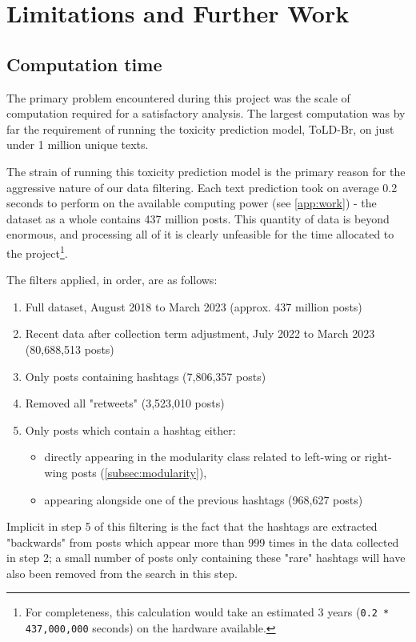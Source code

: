 \documentclass[a4paper,11pt]{article}  %
\begin{document}
	\section{Limitations and Further Work}
	\subsection{Computation time}
	\label{subsec:computation}
	The primary problem encountered during this project was the scale of computation required for a satisfactory analysis. The largest computation was by far the requirement of running the toxicity prediction model, ToLD-Br\parencite{leiteToxicLanguageDetection2020}, on just under 1 million unique texts.
	
	The strain of running this toxicity prediction model is the primary reason for the aggressive nature of our data filtering. Each text prediction took on average 0.2 seconds to perform on the available computing power (see \autoref{app:work}) - the dataset as a whole contains 437 million posts. This quantity of data is beyond enormous, and processing all of it is clearly unfeasible for the time allocated to the project\footnote{For completeness, this calculation would take an estimated 3 years (\texttt{0.2 * 437,000,000} seconds) on the hardware available.}.

	The filters applied, in order, are as follows:
	\begin{enumerate}
		\item Full dataset, August 2018 to March 2023 (approx. 437 million posts)
		\item Recent data after collection term adjustment, July 2022 to March 2023 (80,688,513 posts)
		\item Only posts containing hashtags (7,806,357 posts)
		\item Removed all "retweets" (3,523,010 posts)
		\item Only posts which contain a hashtag either:
		\begin{itemize}
			\item directly appearing in the modularity class related to left-wing or right-wing posts (\autoref{subsec:modularity}),
			\item appearing alongside one of the previous hashtags (968,627 posts)
		\end{itemize}
	\end{enumerate}
	Implicit in step 5 of this filtering is the fact that the hashtags are extracted "backwards" from posts which appear more than 999 times in the data collected in step 2; a small number of posts only containing these "rare" hashtags will have also been removed from the search in this step.
	
\end{document}
